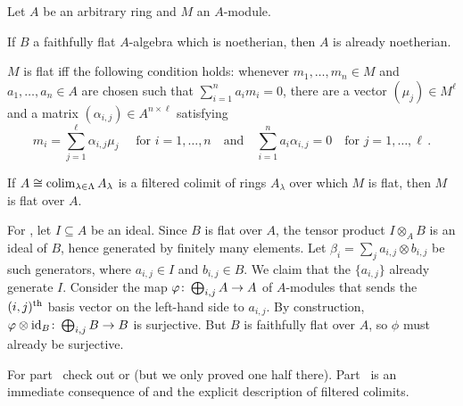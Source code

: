 \begin{lem}\label{lem:flat}
	Let $A$ be an arbitrary ring and $M$ an $A$-module.
	\begin{alphanumerate}
		\item If $B$ a faithfully flat $A$-algebra which is noetherian, then $A$ is already noetherian.
		\item $M$ is flat iff the following condition holds: whenever $m_1,\dotsc,m_n\in M$ and $a_1,\dots,a_n\in A$ are chosen such that $\sum_{i=1}^na_im_i=0$, there are a vector $(\mu_j)\in M^\ell$ and a matrix $(\alpha_{i,j})\in A^{n\times \ell}$ satisfying
		\begin{equation*}
			m_i=\sum_{j=1}^\ell \alpha_{i,j}\mu_j\quad\text{ for }i=1,\dotsc,n\quad\text{and}\quad\sum_{i=1}^na_i\alpha_{i,j}=0\quad\text{for }j=1,\dotsc,\ell\,.
		\end{equation*}
		\item If $A\cong \operatorname*{colim}_{\lambda\in\Lambda}A_\lambda$ is a filtered colimit of rings $A_\lambda$ over which $M$ is flat, then $M$ is flat over $A$.
	\end{alphanumerate}
\end{lem}
\begin{proof*}
	For , let $I\subseteq A$ be an ideal. Since $B$ is flat over $A$, the tensor product $I\otimes_AB$ is an ideal of $B$, hence generated by finitely many elements. Let $\beta_i=\sum_ja_{i,j}\otimes b_{i,j}$ be such generators, where $a_{i,j}\in I$ and $b_{i,j}\in B$. We claim that the $\{a_{i,j}\}$ already generate $I$. Consider the map $\phi\colon \bigoplus_{i,j}A\morphism A$ of $A$-modules that sends the $(i,j)^{\text{th}}$ basis vector on the left-hand side to $a_{i,j}$. By construction, $\phi\otimes\id_B\colon \bigoplus_{i,j}B\morphism B$ is surjective. But $B$ is faithfully flat over $A$, so $\phi$ must already be surjective.
	
	For part~ check out \cite[]{stacks-project} or \cite[Lemma~4.2.1]{jacobians} (but we only proved one half there). Part~ is an immediate consequence of  and the explicit description of filtered colimits.
\end{proof*}
